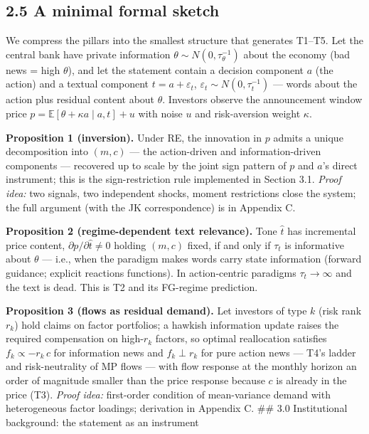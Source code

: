 \subsection{2.5 A minimal formal sketch}\label{a-minimal-formal-sketch}

We compress the pillars into the smallest structure that generates T1--T5. Let the central bank have private information \(\theta \sim N(0, \tau_\theta^{-1})\) about the economy (bad news = high \(\theta\)), and let the statement contain a decision component \(a\) (the action) and a textual component \(t = a + \varepsilon_t\), \(\varepsilon_t \sim N(0, \tau_t^{-1})\) --- words about the action plus residual content about \(\theta\). Investors observe the announcement window price \(p = \mathbb{E}[\theta + \kappa a \mid a, t] + u\) with noise \(u\) and risk-aversion weight \(\kappa\).

\textbf{Proposition 1 (inversion).} Under RE, the innovation in \(p\) admits a unique decomposition into \((m, c)\) --- the action-driven and information-driven components --- recovered up to scale by the joint sign pattern of \(p\) and \(a\)'s direct instrument; this is the sign-restriction rule implemented in Section 3.1. \emph{Proof idea:} two signals, two independent shocks, moment restrictions close the system; the full argument (with the JK correspondence) is in Appendix C.

\textbf{Proposition 2 (regime-dependent text relevance).} Tone \(\hat t\) has incremental price content, \(\partial p / \partial \hat t \neq 0\) holding \((m, c)\) fixed, if and only if \(\tau_t\) is informative about \(\theta\) --- i.e., when the paradigm makes words carry state information (forward guidance; explicit reactions functions). In action-centric paradigms \(\tau_t \to \infty\) and the text is dead. This is T2 and its FG-regime prediction.

\textbf{Proposition 3 (flows as residual demand).} Let investors of type \(k\) (risk rank \(r_k\)) hold claims on factor portfolios; a hawkish information update raises the required compensation on high-\(r_k\) factors, so optimal reallocation satisfies \(f_k \propto -r_k \, c\) for information news and \(f_k \perp r_k\) for pure action news --- T4's ladder and risk-neutrality of MP flows --- with flow response at the monthly horizon an order of magnitude smaller than the price response because \(c\) is already in the price (T3). \emph{Proof idea:} first-order condition of mean-variance demand with heterogeneous factor loadings; derivation in Appendix C. \#\# 3.0 Institutional background: the statement as an instrument

